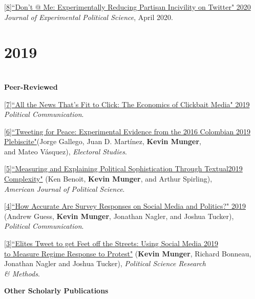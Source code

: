 \documentclass[margin]{res}
\begin{document}
{\href{https://doi.org/10.1017/XPS.2020.14}{[8]``Don't @ Me: Experimentally Reducing Partisan Incivility on Twitter" \hfill 2020\\} \textit{Journal of Experimental Political Science}, April 2020.



\section{ 2019} 

\hfill\\
\textbf{Peer-Reviewed}


\href{https://www.tandfonline.com/doi/abs/10.1080/10584609.2019.1687626}{[7]``All the News That's Fit to Click: The Economics of Clickbait Media" \hfill 2019}\\ \textit{Political Communication}.

\href{https://www.sciencedirect.com/science/article/pii/S026137941930006X}{[6]``Tweeting for Peace: Experimental Evidence from the 2016 Colombian \hfill 2019 Plebiscite"}(Jorge Gallego, Juan D. Mart\'inez, \textbf{Kevin Munger}, \\and Mateo V\'asquez), \textit{Electoral Studies}.


\href{https://onlinelibrary.wiley.com/doi/full/10.1111/ajps.12423}{[5]``Measuring and Explaining Political Sophistication Through Textual\hfill 2019 \\Complexity"} (Ken Benoit, \textbf{Kevin Munger}, and Arthur Spirling),\\ \textit{American Journal of Political Science}.

\href{https://www.tandfonline.com/doi/abs/10.1080/10584609.2018.1504840}{[4]``How Accurate Are Survey Responses on Social Media and Politics?" \hfill 2019 } \\(Andrew Guess, \textbf{Kevin Munger}, Jonathan Nagler, and Joshua Tucker), \\ \textit{Political Communication}.

\href{https://doi.org/10.1017/psrm.2018.3}{[3]``Elites Tweet to get Feet off the Streets: Using Social Media \hfill 2019 \\ to Measure Regime Response to Protest"} (\textbf{Kevin Munger}, Richard Bonneau,\\ Jonathan Nagler and Joshua Tucker), \textit{Political Science Research \\ \& Methods}.


\textbf{Other Scholarly Publications}



}
\end{document}
